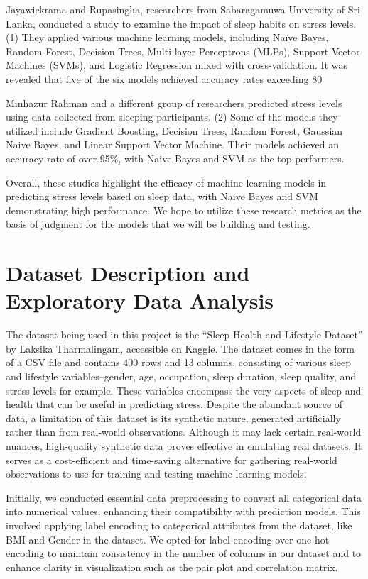 \documentclass[11pt, letterpaper]{article}
\begin{document}
    Jayawickrama and Rupasingha, researchers from Sabaragamuwa University of Sri Lanka, conducted a study to examine the impact of sleep habits on stress levels. (1) They applied various machine learning models, including Naïve Bayes, Random Forest, Decision Trees, Multi-layer Perceptrons (MLPs), Support Vector Machines (SVMs), and Logistic Regression mixed with cross-validation. It was revealed that five of the six models achieved accuracy rates exceeding 80%
    
    Minhazur Rahman and a different group of researchers predicted stress levels using data collected from sleeping participants. (2) Some of the models they utilized include Gradient Boosting, Decision Trees, Random Forest, Gaussian Naive Bayes, and Linear Support Vector Machine. Their models achieved an accuracy rate of over 95\%, with Naive Bayes and SVM as the top performers. 
    
    Overall, these studies highlight the efficacy of machine learning models in predicting stress levels based on sleep data, with Naive Bayes and SVM demonstrating high performance. We hope to utilize these research metrics as the basis of judgment for the models that we will be building and testing.
    

    \section*{Dataset Description and Exploratory Data Analysis}
    The dataset being used in this project is the “Sleep Health and Lifestyle Dataset” by Laksika Tharmalingam, accessible on Kaggle. The dataset comes in the form of a CSV file and contains 400 rows and 13 columns, consisting of various sleep and lifestyle variables–gender, age, occupation, sleep duration, sleep quality, and stress levels for example. These variables encompass the very aspects of sleep and health that can be useful in predicting stress. Despite the abundant source of data, a limitation of this dataset is its synthetic nature, generated artificially rather than from real-world observations. Although it may lack certain real-world nuances, high-quality synthetic data proves effective in emulating real datasets. It serves as a cost-efficient and time-saving alternative for gathering real-world observations to use for training and testing machine learning models.
    
    Initially, we conducted essential data preprocessing to convert all categorical data into numerical values, enhancing their compatibility with prediction models. This involved applying label encoding to categorical attributes from the dataset, like BMI and Gender in the dataset. We opted for label encoding over one-hot encoding to maintain consistency in the number of columns in our dataset and to enhance clarity in visualization such as the pair plot and correlation matrix. 
    
\end{document}

